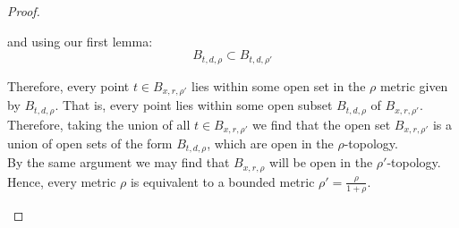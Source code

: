 \documentclass[12pt]{article}
\newlength\tindent
\renewcommand{\indent}{\hspace*{\tindent}}
\begin{document}
\begin{proof}
\begin{enumerate}
	and using our first lemma:
	\begin{equation*}
		B_{t,d,\rho} \subset B_{t,d,\rho'}
	\end{equation*}
	
	\indent Therefore, every point $t \in B_{x,r,\rho'}$ lies within some open set in the $\rho$ metric given by $B_{t,d,\rho}$. That is, every point lies within some open subset $B_{t,d,\rho}$ of $B_{x,r,\rho'}$. \\
	
	\indent Therefore, taking the union of all $t \in B_{x,r,\rho'}$ we find that the open set $B_{x,r,\rho'}$ is a union of open sets of the form $B_{t,d,\rho}$, which are open in the $\rho$-topology. \\
	
	\indent By the same argument we may find that $B_{x,r,\rho}$ will be open in the $\rho'$-topology. Hence, every metric $\rho$ is equivalent to a bounded metric $\rho' = \frac{\rho}{1 + \rho}$.
\end{enumerate}
\end{proof}
\end{document}

